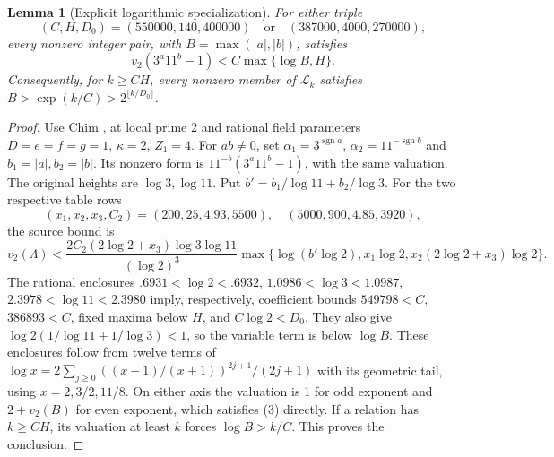 \documentclass[10pt,a4paper]{article}
\newtheorem{lemma}[theorem]{Lemma}
\begin{document}
\begin{lemma}[Explicit logarithmic specialization]
For either triple
\[
 (C,H,D_0)=(550000,140,400000)
 \quad\text{or}\quad(387000,4000,270000),                  \tag{3}
\]
every nonzero integer pair, with $B=\max(|a|,|b|)$, satisfies
\[
 v_2(3^a11^b-1)<C\max\{\log B,H\}.
\]
Consequently, for $k\ge CH$, every nonzero member of $\mathcal L_k$ satisfies
$B>\exp(k/C)>2^{\lfloor k/D_0\rfloor}$.
\end{lemma}
\begin{proof}
Use Chim \cite[Theorem 2.1; Table 1 and formulas, pp.~346--348]{Chim},
at local prime 2 and rational field parameters $D=e=f=g=1$, $\kappa=2$,
$Z_1=4$. For $ab\ne0$, set $\alpha_1=3^{\operatorname{sgn}a}$,
$\alpha_2=11^{-\operatorname{sgn}b}$ and $b_1=|a|,b_2=|b|$.
Its nonzero form is $11^{-b}(3^a11^b-1)$, with the same valuation. The original
heights are $\log3,\log11$. Put $b'=b_1/\log11+b_2/\log3$.
For the two respective table rows
\[
 (x_1,x_2,x_3,C_2)=(200,25,4.93,5500),
 \quad(5000,900,4.85,3920),
\]
the source bound is
\[
 v_2(\Lambda)<\frac{2C_2(2\log2+x_3)\log3\log11}{(\log2)^3}
 \max\{\log(b'\log2),x_1\log2,x_2(2\log2+x_3)\log2\}.
\]
The rational enclosures
$.6931<\log2<.6932$, $1.0986<\log3<1.0987$,
$2.3978<\log11<2.3980$ imply, respectively, coefficient bounds
$549798<C$, $386893<C$, fixed maxima below $H$, and $C\log2<D_0$.
They also give $\log2(1/\log11+1/\log3)<1$, so the variable term is below
$\log B$. These enclosures follow from twelve terms of
$\log x=2\sum_{j\ge0}((x-1)/(x+1))^{2j+1}/(2j+1)$ with its geometric tail,
using $x=2,3/2,11/8$.
On either axis the valuation is 1 for odd exponent and $2+v_2(B)$ for even
exponent, which satisfies (3) directly. If a relation has $k\ge CH$, its
valuation at least $k$ forces $\log B>k/C$. This proves the conclusion.
\end{proof}
\end{document}
